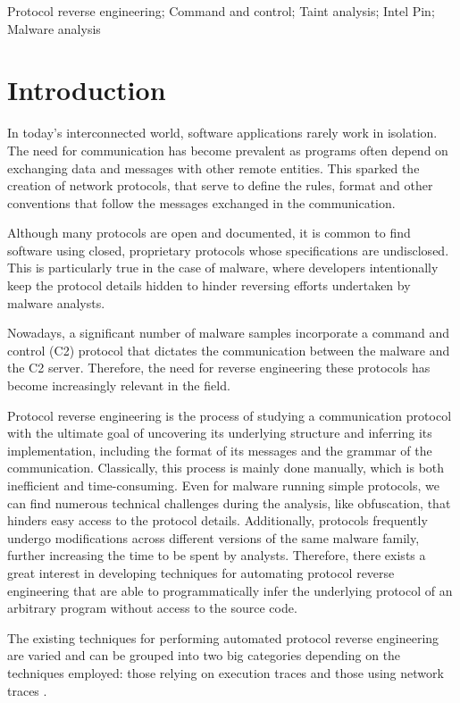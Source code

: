 \documentclass[conference]{IEEEtran}
\begin{document}
\begin{IEEEkeywords}
    Protocol reverse engineering; Command and control; Taint analysis; Intel Pin; Malware analysis
\end{IEEEkeywords}

\section{Introduction}
In today's interconnected world, software applications rarely work in
isolation. The need for communication has become prevalent as programs often
depend on exchanging data and messages with other remote entities. This sparked
the creation of network protocols, that serve to define the rules, format and
other conventions that follow the messages exchanged in the communication.

Although many protocols are open and documented, it is common to find software
using closed, proprietary protocols whose specifications are undisclosed. This
is particularly true in the case of malware, where developers intentionally
keep the protocol details hidden to hinder reversing efforts undertaken by
malware analysts.

Nowadays, a significant number of malware samples incorporate a command and
control (C2) protocol that dictates the communication between the malware and
the C2 server. Therefore, the need for reverse engineering these protocols has
become increasingly relevant in the field.

Protocol reverse engineering is the process of studying a communication
protocol with the ultimate goal of uncovering its underlying structure and
inferring its implementation, including the format of its messages and the
grammar of the communication. Classically, this process is mainly done
manually, which is both inefficient and time-consuming. Even for malware
running simple protocols, we can find numerous technical challenges during the
analysis, like obfuscation, that hinders easy access to the protocol details.
Additionally, protocols frequently undergo modifications across different
versions of the same malware family, further increasing the time to be spent by
analysts. Therefore, there exists a great interest in developing techniques for
automating protocol reverse engineering that are able to programmatically infer
the underlying protocol of an arbitrary program without access to the source
code.

The existing techniques for performing automated protocol reverse engineering
are varied and can be grouped into two big categories depending on the
techniques employed: those relying on execution traces and those using network
traces \cite{sota_apre}\cite{sota_apre2}.
\end{document}
